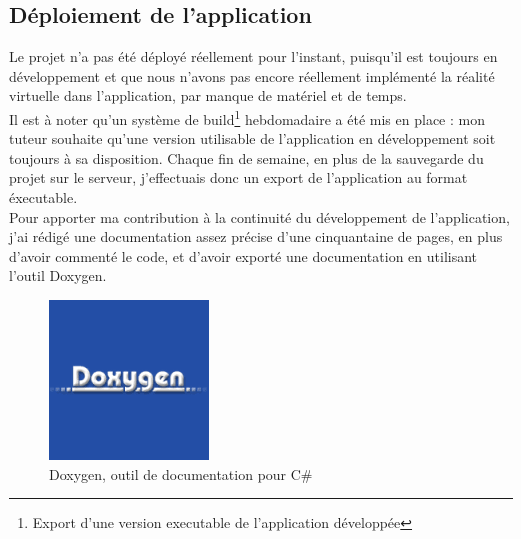 \documentclass[a4paper]{article}
\begin{document}
    \newpage

    \subsection{Déploiement de l'application}
   
    Le projet n'a pas été déployé réellement pour l'instant, puisqu'il est toujours en développement et que nous n'avons pas encore réellement implémenté la réalité virtuelle dans l'application, par manque de matériel et de temps. \\

    Il est à noter qu'un système de build\footnote{Export d'une version executable de l'application développée} hebdomadaire a été mis en place : mon tuteur souhaite qu'une version utilisable de l'application en développement soit toujours à sa disposition. Chaque fin de semaine, en plus de la sauvegarde du projet sur le serveur, j'effectuais donc un export de l'application au format éxecutable. \\
    
    Pour apporter ma contribution à la continuité du développement de l'application, j'ai rédigé une documentation assez précise d'une cinquantaine de pages, en plus d'avoir commenté le code, et d'avoir exporté une documentation en utilisant l'outil Doxygen. \\

    \begin{figure}[H]
        \centering
        \includegraphics{img/logo-doxygen}
        \caption{Doxygen, outil de documentation pour C\#}
    \end{figure}
\end{document}
